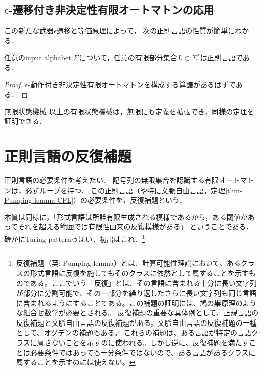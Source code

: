 \subsection{$\epsilon$-遷移付き非決定性有限オートマトンの応用}

\begin{tcolorbox}[colframe=ForestGreen, colback=ForestGreen!10!white, breakable]
    この新たな武器$\epsilon$遷移と等価原理によって，
    次の正則言語の性質が簡単にわかる．
\end{tcolorbox}

\begin{proposition}[有限な言語は全て正則]
    任意のinput alphabet $\Sigma$について，任意の有限部分集合$L\subset\Sigma^*$は正則言語である．
\end{proposition}
\begin{proof}
    $\epsilon$-動作付き非決定性有限オートマトンを構成する算譜があるはずである．
\end{proof}

\begin{itembox}[l]{無限状態機械}
    以上の有限状態機械は，無限にも定義を拡張でき，同様の定理を証明できる．
\end{itembox}

\section{正則言語の反復補題}

\begin{tcolorbox}[colframe=ForestGreen, colback=ForestGreen!10!white, breakable]
    正則言語の必要条件を考えたい．
    記号列の無限集合を認識する有限オートマトンは，必ずループを持つ．
    この正則言語（や特に文脈自由言語，定理\ref{thm-Pumping-lemma-CFL}）の必要条件を，反復補題という．

    本質は同様に，「形式言語は所詮有限生成される模様であるから，ある閾値があってそれを超える範囲では有限性由来の反復模様がある」
    ということである．確かにTuring patternっぽい．初出はこれ\cite{pumping}．\footnote{反復補題（英: Pumping lemma）とは、計算可能性理論において、あるクラスの形式言語に反復を施してもそのクラスに依然として属することを示すものである。ここでいう「反復」とは、その言語に含まれる十分に長い文字列が部分に分割可能で、その一部分を繰り返したさらに長い文字列も同じ言語に含まれるようにすることである。この補題の証明には、鳩の巣原理のような組合せ数学が必要とされる。
    反復補題の重要な具体例として、正規言語の反復補題と文脈自由言語の反復補題がある。文脈自由言語の反復補題の一種として、オグデンの補題もある。
    これらの補題は、ある言語が特定の言語クラスに属さないことを示すのに使われる。しかし逆に、反復補題を満たすことは必要条件ではあっても十分条件ではないので、ある言語があるクラスに属することを示すのには使えない。}
\end{tcolorbox}

